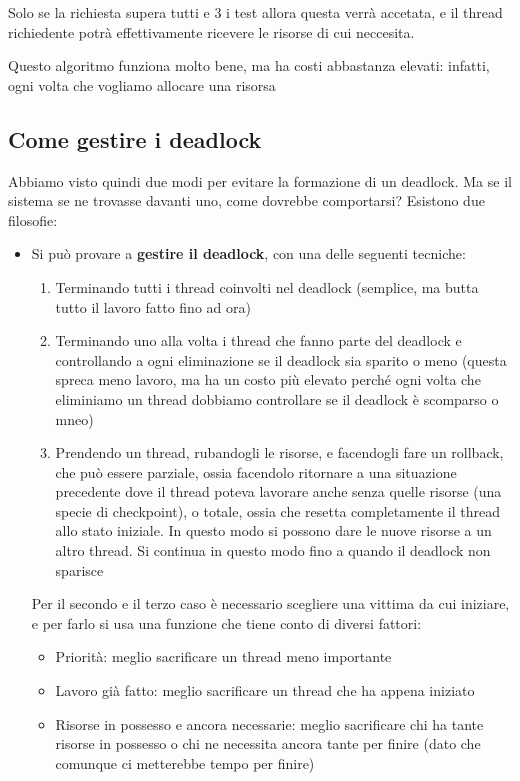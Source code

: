 \documentclass[11pt, a4paper, titlepage, oneside]{scrbook}
\begin{document}
Solo se la richiesta supera tutti e 3 i test allora questa verrà accetata, e il thread richiedente potrà effettivamente ricevere le risorse di cui neccesita. 

Questo algoritmo funziona molto bene, ma ha costi abbastanza elevati: infatti, ogni volta che vogliamo allocare una risorsa 

\subsection{Come gestire i deadlock}

Abbiamo visto quindi due modi per evitare la formazione di un deadlock. Ma se il sistema se ne trovasse davanti uno, come dovrebbe comportarsi? Esistono due filosofie:
\begin{itemize}
    \item Si può provare a \textbf{gestire il deadlock}, con una delle seguenti tecniche:
    \begin{enumerate}
        \item Terminando tutti i thread coinvolti nel deadlock (semplice, ma butta tutto il lavoro fatto fino ad ora)
        \item Terminando uno alla volta i thread che fanno parte del deadlock e controllando a ogni eliminazione se il deadlock sia sparito o meno (questa spreca meno lavoro, ma ha un costo più elevato perché ogni volta che eliminiamo un thread dobbiamo controllare se il deadlock è scomparso o mneo)
        \item Prendendo un thread, rubandogli le risorse, e facendogli fare un rollback, che può essere parziale, ossia facendolo ritornare a una situazione precedente dove il thread poteva lavorare anche senza quelle risorse (una specie di checkpoint), o totale, ossia che resetta completamente il thread allo stato iniziale. In questo modo si possono dare le nuove risorse a un altro thread. Si continua in questo modo fino a quando il deadlock non sparisce
    \end{enumerate}
    Per il secondo e il terzo caso è necessario scegliere una vittima da cui iniziare, e per farlo si usa una funzione che tiene conto di diversi fattori:
    \begin{itemize}
        \item Priorità: meglio sacrificare un thread meno importante
        \item Lavoro già fatto: meglio sacrificare un thread che ha appena iniziato
        \item Risorse in possesso e ancora necessarie: meglio sacrificare chi ha tante risorse in possesso o chi ne necessita ancora tante per finire (dato che comunque ci metterebbe tempo per finire)

\end{itemize}
\end{itemize}
\end{document}
